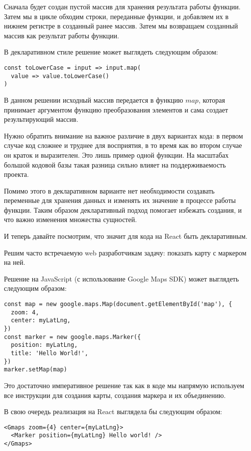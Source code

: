 Сначала будет создан пустой массив для хранения результата работы функции. Затем мы в цикле обходим строки, переданные функции, и добавляем их в нижнем регистре в созданный ранее массив. Затем мы возвращаем созданный массив как результат работы функции.

В декларативном стиле решение может выглядеть следующим образом:

\begin{lstlisting}
const toLowerCase = input => input.map(
  value => value.toLowerCase()
)
\end{lstlisting}

В данном решении исходный массив передается в функцию $map$, которая принимает аргументом функцию преобразования элементов и сама создает результирующий массив.

Нужно обратить внимание на важное различие в двух вариантах кода: в первом случае код сложнее и труднее для восприятия, в то время как во втором случае он краток и выразителен. Это лишь пример одной функции. На масштабах большой кодовой базы такая разница сильно влияет на поддерживаемость проекта.

Помимо этого в декларативном варианте нет необходимости создавать переменные для хранения данных и изменять их значение в процессе работы функции. Таким образом декларативный подход помогает избежать создания, и что важно изменения множества сущностей.

И теперь давайте посмотрим, что значит для кода на React быть декларативным.

Решим часто встречаемую web разработчикам задачу: показать карту с маркером на ней.

Решение на JavaScript (с использование Google Maps SDK) может выглядеть следующим образом:

\begin{lstlisting}
const map = new google.maps.Map(document.getElementById('map'), {
  zoom: 4,
  center: myLatLng,
})
const marker = new google.maps.Marker({
  position: myLatLng,
  title: 'Hello World!',
})
marker.setMap(map)
\end{lstlisting}

Это достаточно императивное решение так как в коде мы напрямую используем все инструкции для создания карты, создания маркера и их объединению.

В свою очередь реализация на React выглядела бы следующим образом:

\begin{lstlisting}
<Gmaps zoom={4} center={myLatLng}>
  <Marker position={myLatLng} Hello world! />
</Gmaps> 
\end{lstlisting}


